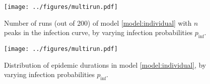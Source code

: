 \documentclass[11pt]{article}
\numberwithin{equation}{subsection}
\begin{document}
    \begin{figure}[h!]
    \begin{center}
        \texttt{[image: ../figures/multirun.pdf]}
    \end{center}
    \caption{
        Number of runs (out of 200) of model \ref{model:individual} with $n$
        peaks in the infection curve, by varying infection probabilities
        $p_\text{inf}$.
    }
    \label{fig:peaks}
    \end{figure}

    \begin{figure}[h!]
    \begin{center}
        \texttt{[image: ../figures/multirun.pdf]}
    \end{center}
    \caption{
        Distribution of epidemic durations in model \ref{model:individual}, by
        varying infection probabilities $p_\text{inf}$.
    }
    \label{fig:durations}
    \end{figure}
\end{document}
